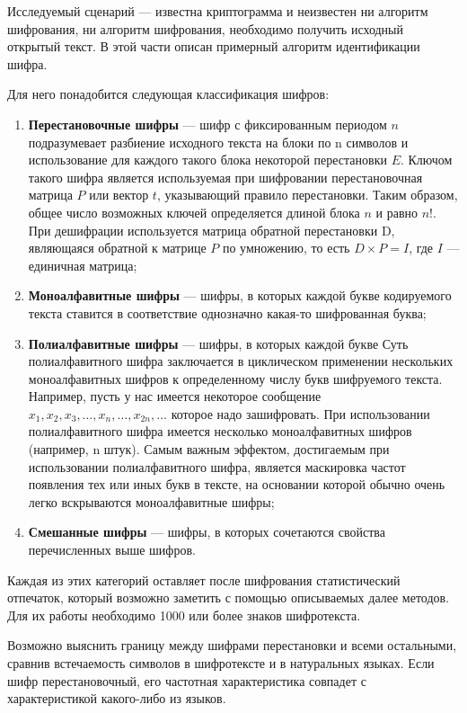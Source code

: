 Исследуемый сценарий --- известна криптограмма и неизвестен
ни алгоритм шифрования, ни
алгоритм шифрования, необходимо получить исходный открытый
текст. В этой части описан примерный алгоритм идентификации 
шифра.

Для него понадобится следующая классификация шифров:

\begin{enumerate}
\item \textbf{Перестановочные шифры} --- шифр с фиксированным периодом 
    $n$ подразумевает разбиение исходного текста на блоки по 
    n символов и использование для каждого такого блока некоторой 
    перестановки $E$. Ключом такого шифра является используемая 
    при шифровании перестановочная матрица $P$ или вектор $t$, указывающий 
    правило перестановки. Таким образом, общее число возможных 
    ключей определяется длиной блока $n$ и равно $n!$. При дешифрации 
    используется матрица обратной перестановки D, являющаяся 
    обратной к матрице $P$ по умножению, то есть $D \times P = I$, 
    где $I$ — единичная матрица;
\item \textbf{Моноалфавитные шифры} --- шифры, в которых каждой букве 
    кодируемого текста ставится в соответствие однозначно какая-то
    шифрованная буква;
\item \textbf{Полиалфавитные шифры} --- шифры, в которых каждой букве 
    Суть полиалфавитного шифра заключается в циклическом применении 
    нескольких моноалфавитных шифров к определенному числу букв 
    шифруемого текста. Например, пусть у нас имеется некоторое 
    сообщение $x_1, x_2, x_3, \dots, x_n, \dots, x_{2n}, \dots$ 
    которое надо 
    зашифровать. При использовании полиалфавитного шифра имеется 
    несколько моноалфавитных шифров (например, n штук).
    Самым важным эффектом, достигаемым при использовании 
    полиалфавитного шифра, является маскировка частот появления 
    тех или иных букв в тексте, на основании которой обычно очень 
    легко вскрываются моноалфавитные шифры;
\item \textbf{Смешанные шифры} --- шифры, в которых сочетаются 
    свойства перечисленных выше шифров.
\end{enumerate}

Каждая из этих категорий оставляет после шифрования статистический 
отпечаток, который возможно заметить с помощью описываемых 
далее методов. Для их работы необходимо 1000 или более 
знаков шифротекста.

Возможно выяснить границу между шифрами перестановки 
и всеми остальными, сравнив встечаемость символов в шифротексте 
и в натуральных языках. Если шифр перестановочный, его частотная 
характеристика совпадет с характеристикой какого-либо из языков.

